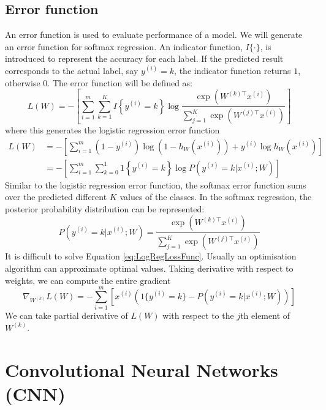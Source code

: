 \subsection{Error function}
An error function is used to evaluate performance of a model. We will generate an error function for softmax regression. An indicator function, $I\{\cdot\}$, is introduced to represent the accuracy for each label. If the predicted result corresponds to the actual label, say $y^{(i)} = k$, the indicator function returns $1$, otherwise $0$. The error function will be defined as:
\begin{equation}\label{eq:LogLossFunc}
L(W) = - \left[ \sum_{i=1}^{m} \sum_{k=1}^{K}  I\left\{y^{(i)} = k\right\} \log \frac{\exp(W^{(k)\top} x^{(i)})}{\sum_{j=1}^K \exp(W^{(j)\top} x^{(i)})}\right]
\end{equation}
where this generates the logistic regression error function
\begin{align}\label{eq:LogRegLossFunc}
L(W) &= - \left[ \sum_{i=1}^m   (1-y^{(i)}) \log (1-h_W(x^{(i)})) + y^{(i)} \log h_W(x^{(i)}) \right] \\
&= - \left[ \sum_{i=1}^{m} \sum_{k=0}^{1} 1\left\{y^{(i)} = k\right\} \log P(y^{(i)} = k | x^{(i)} ; W) \right]
\end{align}
Similar to the logistic regression error function, the softmax error function sums over the predicted different $K$ values of the classes. In the softmax regression, the posterior probability distribution can be represented:
\begin{equation}\label{eq:PostProbDis}
P(y^{(i)} = k | x^{(i)} ; W) = \frac{\exp(W^{(k)\top} x^{(i)})}{\sum_{j=1}^K \exp(W^{(j)\top} x^{(i)}) }
\end{equation}
It is difficult to solve Equation \ref{eq:LogRegLossFunc}. Usually an optimisation algorithm can approximate optimal values. Taking derivative with respect to weights, we can compute the entire gradient 
\begin{equation}\label{eq:PartDer}
\nabla_{W^{(k)}} L(W) = - \sum_{i=1}^{m}{ \left[ x^{(i)} \left( 1\{ y^{(i)} = k\}  - P(y^{(i)} = k | x^{(i)}; W) \right) \right]  }
\end{equation}
We can take partial derivative of $L(W)$ with respect to the $j$th element of $W^{(k)}$.

\section{Convolutional Neural Networks (CNN)}

